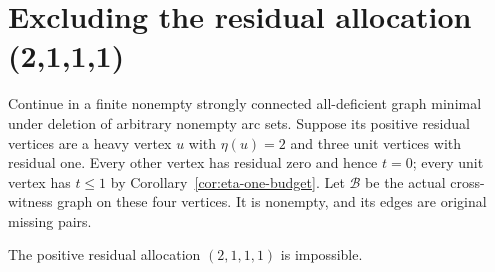 \section{Excluding the residual allocation (2,1,1,1)}
\label{sec:exclude-two-one-one-one}

Continue in a finite nonempty strongly connected all-deficient graph
minimal under deletion of arbitrary nonempty arc sets.
Suppose its positive residual vertices are a heavy vertex $u$ with
$\eta(u)=2$ and three unit vertices with residual one.
Every other vertex has residual zero and hence $t=0$; every unit
vertex has $t\le1$ by Corollary~\ref{cor:eta-one-budget}.
Let $\mathcal B$ be the actual cross-witness graph on these four
vertices. It is nonempty, and its edges are original missing pairs.

\begin{theorem}\label{thm:no-two-one-one-one}
The positive residual allocation $(2,1,1,1)$ is impossible.
\end{theorem}
